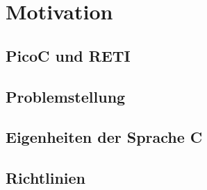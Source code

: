 \chapter{Motivation}
\section{PicoC und RETI}
\section{Problemstellung}
\section{Eigenheiten der Sprache C}
\section{Richtlinien}
